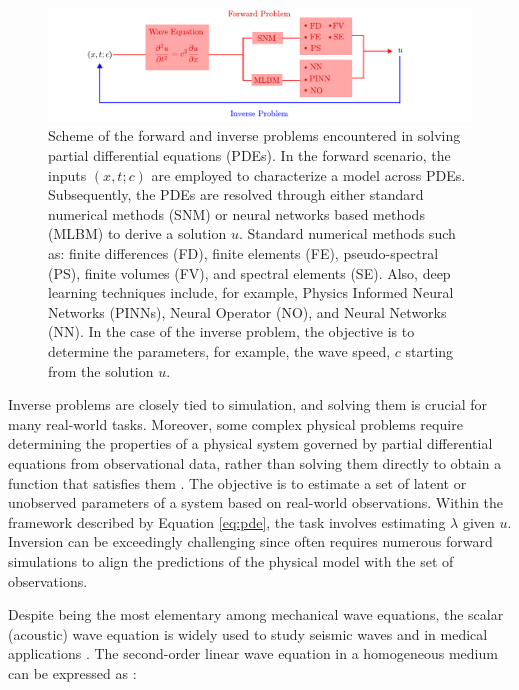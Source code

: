 \documentclass[11pt,twoside]{article}
\begin{document}
\begin{figure}[H]
\includegraphics{figs/forward_inverse_modeling_waves.pdf}
    \caption{Scheme of the forward and inverse problems encountered in solving partial differential equations (PDEs). In the forward 
    scenario, the inputs $(x,t;c)$ are employed to characterize a model across PDEs. Subsequently, the PDEs are resolved through 
    either standard numerical methods (SNM) or neural networks based methods (MLBM) to derive a solution $u$. Standard numerical 
    methods such as: finite differences (FD), finite elements (FE), pseudo-spectral (PS), finite volumes (FV), and spectral 
    elements (SE). Also, deep learning techniques include, for example, Physics Informed Neural Networks (PINNs), Neural Operator 
    (NO), and Neural Networks (NN). In the case of the inverse problem, the objective is to determine the parameters, for example, 
    the wave speed, $c$ starting from the solution $u$.}
    \label{fig:forward_inverse}
\end{figure}

Inverse problems are closely tied to simulation, and solving them is crucial for many real-world tasks. Moreover, some complex physical 
problems require determining the properties of a physical system governed by partial differential equations from observational data, 
rather than solving them directly to obtain a function that satisfies them 
\citep{galiounas_battery_2022, ren_seismicnet_2024,mccann_convolutional_2017}. The objective is to estimate a set of latent or 
unobserved parameters of a system based on real-world observations. Within the framework described by Equation \ref{eq:pde}, 
the task involves estimating $\lambda$ given $u$. Inversion can be exceedingly challenging since often requires numerous forward 
simulations to align the predictions of the physical model with the set of observations. 

Despite being the most elementary among mechanical wave equations, the scalar (acoustic) wave equation is widely used to study seismic waves and 
in medical applications \citep{moseley_physics-informed_2022, alkhadhr_wave_2023}. The second-order linear wave equation in a homogeneous 
medium can be expressed as \citep{Carcione2002}:
\end{document}
